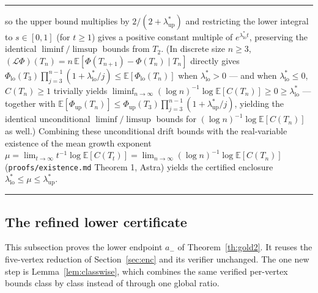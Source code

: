 \documentclass[11pt]{article}
\theoremstyle{remark}
\numberwithin{equation}{section}
\newenvironment{transcription}{\par\medskip\noindent\rule{\linewidth}{0.4pt}\par\nopagebreak}{\par\nopagebreak\noindent\rule{\linewidth}{0.4pt}\par\medskip}
\begin{document}
\begin{transcription}
so the upper bound multiplies by $2/(2 + \lambda_{\mathrm{up}}^*)$ and restricting the lower integral to $s \in [0, 1]$ (for $t \ge 1$) gives a positive constant multiple of $e^{\lambda_{\mathrm{lo}}^* t}$, preserving the identical $\liminf/\limsup$ bounds from $T_2$. (In discrete size $n \ge 3$, $(\mathcal L\Phi)(T_n) = n\,\mathbb E[\Phi(T_{n+1}) - \Phi(T_n) \mid T_n]$ directly gives $\Phi_{\mathrm{lo}}(T_3)\prod_{j=3}^{n-1}(1 + \lambda_{\mathrm{lo}}^*/j) \le \mathbb E[\Phi_{\mathrm{lo}}(T_n)]$ when $\lambda_{\mathrm{lo}}^* > 0$ --- and when $\lambda_{\mathrm{lo}}^* \le 0$, $C(T_n) \ge 1$ trivially yields $\liminf_{n\to\infty}(\log n)^{-1}\log\mathbb E[C(T_n)] \ge 0 \ge \lambda_{\mathrm{lo}}^*$ --- together with $\mathbb E[\Phi_{\mathrm{up}}(T_n)] \le \Phi_{\mathrm{up}}(T_3)\prod_{j=3}^{n-1}(1 + \lambda_{\mathrm{up}}^*/j)$, yielding the identical unconditional $\liminf/\limsup$ bounds for $(\log n)^{-1}\log\mathbb E[C(T_n)]$ as well.) Combining these unconditional drift bounds with the real-variable existence of the mean growth exponent $\mu = \lim_{t\to\infty} t^{-1}\log \mathbb E[C(T_t)] = \lim_{n\to\infty} (\log n)^{-1}\log \mathbb E[C(T_n)]$ (\texttt{proofs/existence.md} Theorem 1, Astra) yields the certified enclosure $\lambda_{\mathrm{lo}}^* \le \mu \le \lambda_{\mathrm{up}}^*$.
\end{transcription}

\subsection{The refined lower certificate}\label{app:refined}
This subsection proves the lower endpoint $a_-$ of Theorem~\ref{th:gold2}. It reuses the five-vertex reduction of Section~\ref{sec:enc} and its verifier unchanged. The one new step is Lemma~\ref{lem:classwise}, which combines the same verified per-vertex bounds class by class instead of through one global ratio.
\end{document}
